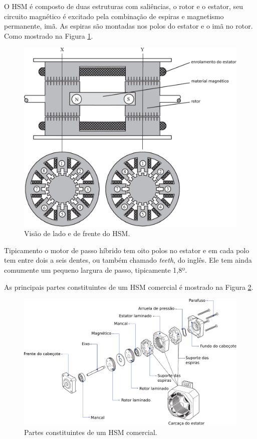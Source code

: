 O HSM é composto de duas estruturas com saliências, o rotor e o estator, seu circuito magnético é excitado pela combinação de espiras e magnetismo permanente, imã. As espiras são montadas nos polos do estator e o imã no rotor. Como mostrado na Figura \ref{fig:estrutura_HSM}. \cite{SteppingBook}

	\begin{figure}[!h]
		\centering
		\includegraphics[width = \columnwidth]{Images/estrutura_HSM.pdf}
		\caption{Visão de lado e de frente do HSM. \cite{SteppingBook}}
		\label{fig:estrutura_HSM}
	\end{figure}
	
Tipicamento o motor de passo híbrido tem oito polos no estator e em cada polo tem entre dois a seis dentes, ou também chamado \emph{teeth}, do inglês. Ele tem ainda comumente um pequeno largura de passo, tipicamente 1,8º. \cite{SteppingBook}

As principais partes constituintes de um HSM comercial é mostrado na Figura \ref{fig:partes_SM}.

	\begin{figure}[!h]
		\centering
		\includegraphics[width = \columnwidth]{Images/partes_HSM.pdf}
		\caption{Partes constituintes de um HSM comercial. \cite{MoonsHSM}}
		\label{fig:partes_SM}
	\end{figure}
	
